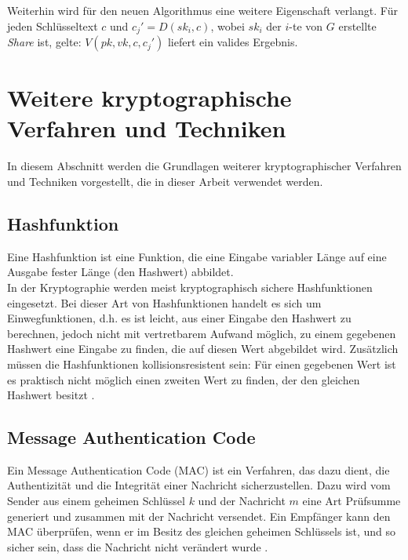Weiterhin wird für den neuen Algorithmus eine weitere Eigenschaft verlangt. Für jeden Schlüsseltext \(c\) und \(c_j' = D(sk_i,c)\), wobei \(sk_i\) der \(i\)-te von \(G\) erstellte \textit{Share} ist, gelte: \(V(pk, vk, c, c_j')\) liefert ein valides Ergebnis.



\section{Weitere kryptographische Verfahren und Techniken}

In diesem Abschnitt werden die Grundlagen weiterer kryptographischer Verfahren und Techniken vorgestellt, die in dieser Arbeit verwendet werden.


\subsection{Hashfunktion}

Eine Hashfunktion ist eine Funktion, die eine Eingabe variabler Länge auf eine Ausgabe fester Länge (den Hashwert) abbildet.\\
In der Kryptographie werden meist kryptographisch sichere Hashfunktionen eingesetzt. Bei dieser Art von Hashfunktionen handelt es sich um Einwegfunktionen, d.h. es ist leicht, aus einer Eingabe den Hashwert zu berechnen, jedoch nicht mit vertretbarem Aufwand möglich, zu einem gegebenen Hashwert eine Eingabe zu finden, die auf diesen Wert abgebildet wird. Zusätzlich müssen die Hashfunktionen kollisionsresistent sein: Für einen gegebenen Wert ist es praktisch nicht möglich einen zweiten Wert zu finden, der den gleichen Hashwert besitzt \cite{Schneier2006}.

\subsection{Message Authentication Code}

\label{sec_mac}

Ein Message Authentication Code (MAC) ist ein Verfahren, das dazu dient, die Authentizität und die Integrität einer Nachricht sicherzustellen. Dazu wird vom Sender aus einem geheimen Schlüssel \(k\) und der Nachricht \(m\) eine Art Prüfsumme generiert und zusammen mit der Nachricht versendet. Ein Empfänger kann den MAC überprüfen, wenn er im Besitz des gleichen geheimen Schlüssels ist, und so sicher sein, dass die Nachricht nicht verändert wurde \cite{Schneier2006}.

